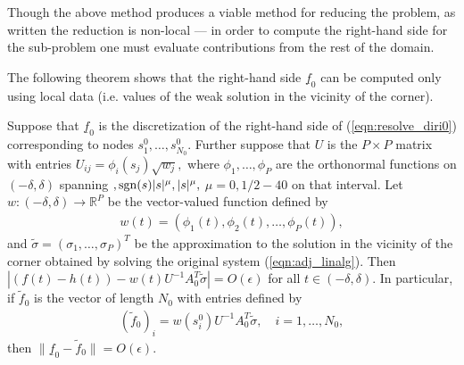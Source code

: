 \begin{remark}
Though the above method produces a viable method for reducing the problem, as written the reduction is non-local --- in order to compute the right-hand side for the sub-problem one must evaluate contributions from the rest of the domain.
\end{remark}

The following theorem shows that the right-hand side $\underline{f}_0$ can be computed only using local data (i.e. values of the weak solution in the vicinity of the corner).\\
\begin{theorem}
Suppose that $\underline{f}_0$ is the discretization of the right-hand side of (\ref{eqn:resolve_diri0}) corresponding to nodes $s^0_1,\dots,s^0_{N_0}.$ Further suppose that $U$ is the $P\times P$ matrix with entries $U_{ij} = \phi_i(s_j) \sqrt{w_j},$ where $\phi_1,\dots,\phi_P$ are the orthonormal functions on $(-\delta,\delta)$ spanning $,{\rm sgn}(s)|s|^\mu, |s|^\mu,$ $\mu=0,1/2-40$ on that interval. Let $w:(-\delta,\delta) \to \mathbb{R}^P$ be the vector-valued function defined by
\begin{align}
w(t) = (\phi_1(t),\phi_2(t),\dots,\phi_P(t)),
\end{align}
and $\tilde{\sigma} = (\sigma_1,\dots,\sigma_P)^T$ be the approximation to the solution in the vicinity of the corner obtained by solving the original system (\ref{eqn:adj_linalg}). Then $|(f(t)-h(t)) - w(t) U^{-1} A_0^T \tilde{\sigma}| = O(\epsilon)$ for all $t \in(-\delta,\delta).$ In particular, if $\tilde{f}_0$ is the vector of length $N_0$ with entries defined by
\begin{align}
(\tilde{f}_0)_i = w(s^0_i) U^{-1} A_0^T \tilde{\sigma}, \quad i=1,\dots,N_0,
\end{align}
then $\| \underline{f}_0 - \tilde{f}_0\| = O(\epsilon).$
\end{theorem}

